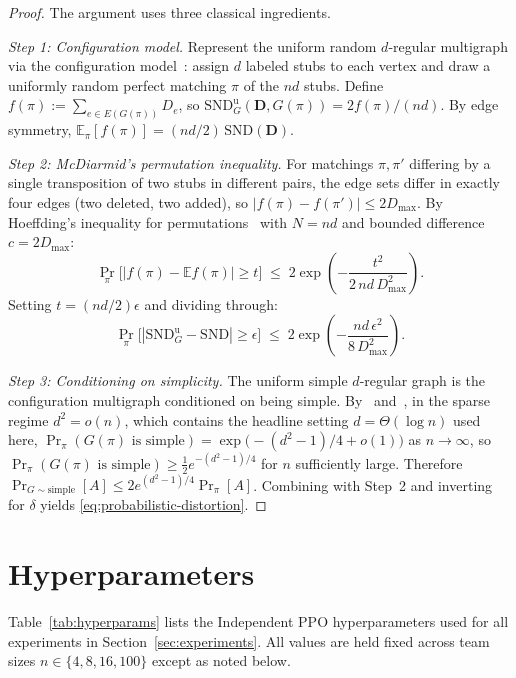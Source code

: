 \documentclass{article}
\theoremstyle{plain}
\theoremstyle{definition}
\theoremstyle{remark}
\newcommand{\E}{\mathbb{E}}
\newcommand{\SND}{\ensuremath{\mathrm{SND}}}
\newcommand{\SNDG}{\mathrm{SND}_{G}}
\begin{document}
\begin{proof}
The argument uses three classical ingredients.

\emph{Step 1: Configuration model.}
Represent the uniform random $d$-regular multigraph via the configuration
model~\citep{bollobas1980probabilistic}: assign $d$ labeled stubs to each
vertex and draw a uniformly random perfect matching $\pi$ of the $nd$
stubs. Define $f(\pi):=\sum_{e\in E(G(\pi))}D_e$, so
$\SNDG^{\mathrm{u}}(\mathbf{D},G(\pi))=2f(\pi)/(nd)$. By edge symmetry,
$\E_\pi[f(\pi)]=(nd/2)\,\SND(\mathbf{D})$.

\emph{Step 2: McDiarmid's permutation inequality.}
For matchings $\pi,\pi'$ differing by a single transposition of two stubs
in different pairs, the edge sets differ in exactly four edges (two
deleted, two added), so $|f(\pi)-f(\pi')|\leq 2D_{\max}$. By Hoeffding's
inequality for permutations~\citep[\S6.1]{mcdiarmid1989method} with
$N=nd$ and bounded difference $c=2D_{\max}$:
\[
\Pr_\pi\!\bigl[|f(\pi)-\E f(\pi)|\geq t\bigr]
\;\leq\; 2\exp\!\left(-\frac{t^2}{2\,nd\,D_{\max}^2}\right).
\]
Setting $t=(nd/2)\epsilon$ and dividing through:
\[
\Pr_\pi\!\bigl[|\SNDG^{\mathrm{u}}-\SND|\geq\epsilon\bigr]
\;\leq\; 2\exp\!\left(-\frac{nd\,\epsilon^2}{8\,D_{\max}^2}\right).
\]

\emph{Step 3: Conditioning on simplicity.}
The uniform simple $d$-regular graph is the configuration multigraph
conditioned on being simple. By~\citet{bollobas1980probabilistic}
and~\citet{mckay1981subgraphs}, in the sparse regime $d^2=o(n)$, which
contains the headline setting $d=\Theta(\log n)$ used here,
$\Pr_\pi(G(\pi)\text{ is simple})=\exp\!\bigl(-(d^2-1)/4 + o(1)\bigr)$
as $n\to\infty$, so
$\Pr_\pi(G(\pi)\text{ is simple})\geq\tfrac{1}{2}e^{-(d^2-1)/4}$ for $n$
sufficiently large. Therefore
$\Pr_{G\sim\mathrm{simple}}[A]\leq 2e^{(d^2-1)/4}\Pr_\pi[A]$.
Combining with Step~2 and inverting for $\delta$ yields
\eqref{eq:probabilistic-distortion}.
\end{proof}

\section{Hyperparameters}
\label{app:hyperparams}

Table~\ref{tab:hyperparams} lists the Independent PPO hyperparameters
used for all experiments in Section~\ref{sec:experiments}. All values
are held fixed across team sizes $n \in \{4, 8, 16, 100\}$ except as
noted below.
\end{document}

